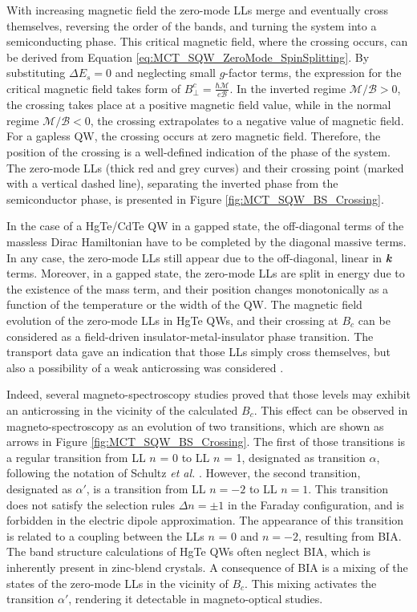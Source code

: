 \documentclass[titlepage,a4paper]{book}
\begin{document}
With increasing magnetic field the zero-mode LLs merge and eventually cross themselves, reversing the order of the bands, and turning the system into a semiconducting phase. This critical magnetic field, where the crossing occurs, can be derived from Equation \ref{eq:MCT_SQW_ZeroMode_SpinSplitting}. By substituting $\Delta E_s = 0$ and neglecting small $g$-factor terms, the expression for the critical magnetic field takes form of $B^c_{\perp} = \frac{\hbar \mathcal{M}}{e\mathcal{B}}$. In the inverted regime $\mathcal{M}/\mathcal{B} > 0$, the crossing takes place at a positive magnetic field value, while in the normal regime $\mathcal{M}/\mathcal{B} < 0$, the crossing extrapolates to a negative value of magnetic field. For a gapless QW, the crossing occurs at zero magnetic field. Therefore, the position of the crossing is a well-defined indication of the phase of the system. The zero-mode LLs (thick red and grey curves) and their crossing point (marked with a vertical dashed line), separating the inverted phase from the semiconductor phase, is presented in Figure \ref{fig:MCT_SQW_BS_Crossing}. 

In the case of a HgTe/CdTe QW in a gapped state, the off-diagonal terms of the massless Dirac Hamiltonian have to be completed by the diagonal massive terms. In any case, the zero-mode LLs still appear due to the off-diagonal, linear in \textbf{\textit{k}} terms. Moreover, in a gapped state, the zero-mode LLs are split in energy due to the existence of the mass term, and their position changes monotonically as a function of the temperature or the width of the QW. The magnetic field evolution of the zero-mode LLs in HgTe QWs, and their crossing at $B_c$ can be considered as a field-driven insulator-metal-insulator phase transition. The transport data \cite{Konig_Topology} gave an indication that those LLs simply cross themselves, but also a possibility of a weak anticrossing was considered \cite{Konig_MCT_SQW}.

Indeed, several magneto-spectroscopy studies \cite{Orlita_MCT_QW}\cite{Zholudev_MCT_QW} proved that those levels may exhibit an anticrossing in the vicinity of the calculated $B_c$. This effect can be observed in magneto-spectroscopy as an evolution of two transitions, which are shown as arrows in Figure \ref{fig:MCT_SQW_BS_Crossing}. The first of those transitions is a regular transition from LL $n$ = 0 to LL $n$ = 1, designated as transition $\alpha$, following the notation of Schultz \textit{et al.} \cite{Schultz}. However, the second transition, designated as $\alpha'$, is a transition from LL $n = -2$ to LL $n = 1$. This transition does not satisfy the selection rules $\Delta n = \pm 1$ in the Faraday configuration, and is forbidden in the electric dipole approximation. The appearance of this transition is related to a coupling between the LLs $n$ = 0 and $n = -2$, resulting from BIA. The band structure calculations of HgTe QWs often neglect BIA, which is inherently present in zinc-blend crystals. A consequence of BIA is a mixing of the states of the zero-mode LLs in the vicinity of $B_c$. This mixing activates the transition $\alpha'$, rendering it detectable in magneto-optical studies.
\end{document}
